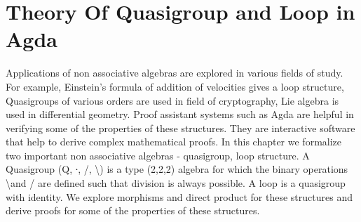 \chapter{Theory Of Quasigroup and Loop in Agda}
Applications of non associative algebras are explored in various fields of study. For example, Einstein's formula of addition of velocities gives a loop structure, Quasigroups of various orders are used in field of cryptography, Lie algebra is used in differential geometry. Proof assistant systems such as Agda are helpful in verifying some of the properties of these structures. They are interactive software that help to derive complex mathematical proofs. In this chapter we formalize two important non associative algebras - quasigroup, loop structure. A Quasigroup (Q, ∙, /, \textbackslash ) is a type (2,2,2) algebra for which the binary operations \textbackslash  and / are defined such that division is always possible.  A loop is a quasigroup with identity. We explore morphisms and direct product for these structures and derive proofs for some of the properties of these structures. \\

